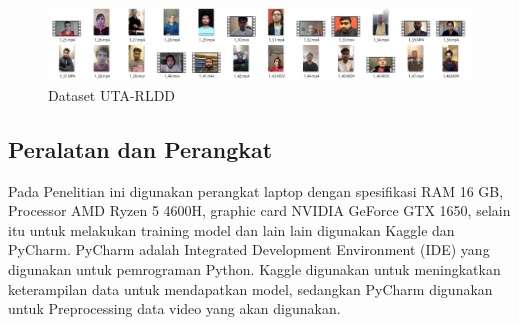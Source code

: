 \begin{figure} [H] \centering
  \includegraphics[width=\textwidth]{gambar/uta.jpg}
  \caption{Dataset UTA-RLDD}
  \label{fig:UTARLDD}
\end{figure}


\subsection{Peralatan dan Perangkat}
Pada Penelitian ini digunakan perangkat laptop dengan spesifikasi RAM 16 GB, Processor AMD Ryzen 5 4600H, graphic card NVIDIA GeForce GTX 1650, selain itu untuk melakukan training model dan lain lain digunakan Kaggle dan PyCharm. PyCharm adalah Integrated Development Environment (IDE) yang digunakan untuk pemrograman Python. Kaggle digunakan untuk meningkatkan keterampilan data untuk mendapatkan model, sedangkan PyCharm digunakan untuk Preprocessing data video yang akan digunakan.
